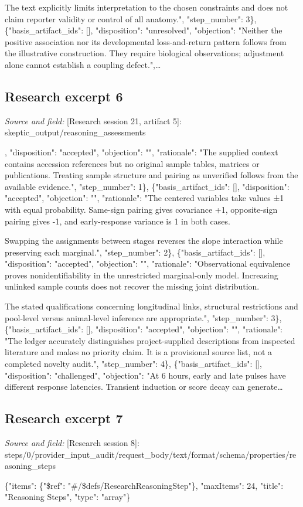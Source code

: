 \documentclass[11pt]{article}
\begin{document}
The text explicitly limits interpretation to the chosen constraints and does not claim reporter validity or control of all anatomy.", "step\_number": 3\}, \{"basis\_artifact\_ids": [], "disposition": "unresolved", "objection": "Neither the positive association nor its developmental loss-and-return pattern follows from the illustrative construction. They require biological observations; adjustment alone cannot establish a coupling defect.",\ldots{}

\subsection{Research excerpt 6}
\textit{Source and field: }[Research session 21, artifact 5]: skeptic\_output/reasoning\_assessments\par
[\{"basis\_artifact\_ids": [], "disposition": "accepted", "objection": "", "rationale": "The supplied context contains accession references but no original sample tables, matrices or publications. Treating sample structure and pairing as unverified follows from the available evidence.", "step\_number": 1\}, \{"basis\_artifact\_ids": [], "disposition": "accepted", "objection": "", "rationale": "The centered variables take values ±1 with equal probability. Same-sign pairing gives covariance +1, opposite-sign pairing gives -1, and early-response variance is 1 in both cases.

Swapping the assignments between stages reverses the slope interaction while preserving each marginal.", "step\_number": 2\}, \{"basis\_artifact\_ids": [], "disposition": "accepted", "objection": "", "rationale": "Observational equivalence proves nonidentifiability in the unrestricted marginal-only model. Increasing unlinked sample counts does not recover the missing joint distribution.

The stated qualifications concerning longitudinal links, structural restrictions and pool-level versus animal-level inference are appropriate.", "step\_number": 3\}, \{"basis\_artifact\_ids": [], "disposition": "accepted", "objection": "", "rationale": "The ledger accurately distinguishes project-supplied descriptions from inspected literature and makes no priority claim. It is a provisional source list, not a completed novelty audit.", "step\_number": 4\}, \{"basis\_artifact\_ids": [], "disposition": "challenged", "objection": "At 6 hours, early and late pulses have different response latencies. Transient induction or score decay can generate\ldots{}

\subsection{Research excerpt 7}
\textit{Source and field: }[Research session 8]: steps/0/provider\_input\_audit/request\_body/text/format/schema/properties/reasoning\_steps\par
\{"items": \{"\$ref": "\#/\$defs/ResearchReasoningStep"\}, "maxItems": 24, "title": "Reasoning Steps", "type": "array"\}
\end{document}
